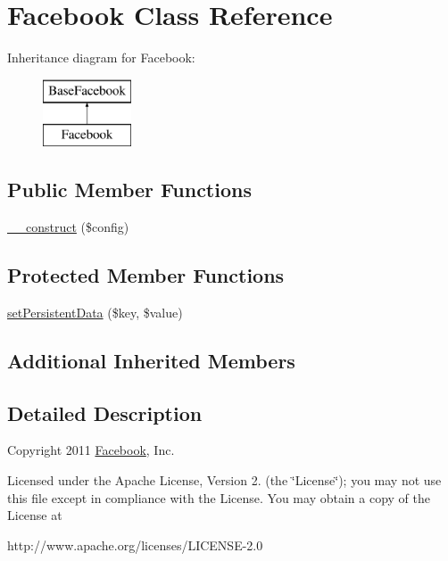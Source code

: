 \hypertarget{class_facebook}{\section{Facebook Class Reference}
\label{class_facebook}
}
Inheritance diagram for Facebook\-:\begin{figure}[H]
\begin{center}
\leavevmode
\includegraphics[height=2.000000cm]{class_facebook}
\end{center}
\end{figure}
\subsection*{Public Member Functions}
\begin{DoxyCompactItemize}
\item 
\hyperlink{class_facebook_a764229508830d143551d167e786c42f4}{\-\_\-\-\_\-construct} (\$config)
\end{DoxyCompactItemize}
\subsection*{Protected Member Functions}
\begin{DoxyCompactItemize}
\item 
\hyperlink{class_facebook_a8f094cc1c798c533283018a8100dffdf}{set\-Persistent\-Data} (\$key, \$value)
\end{DoxyCompactItemize}
\subsection*{Additional Inherited Members}


\subsection{Detailed Description}
Copyright 2011 \hyperlink{class_facebook}{Facebook}, Inc.

Licensed under the Apache License, Version 2. (the \char`\"{}\-License\char`\"{}); you may not use this file except in compliance with the License. You may obtain a copy of the License at \begin{DoxyVerb}http://www.apache.org/licenses/LICENSE-2.0
\end{DoxyVerb}


